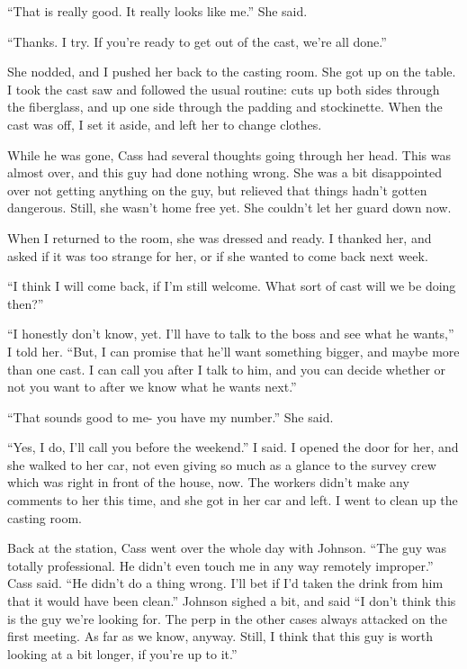 ``That is really good. It really looks like me.'' She said.

``Thanks. I try. If you're ready to get out of the cast, we're all done.''

She nodded, and I pushed her back to the casting room. She got up on the table. I took the
cast saw and followed the usual routine: cuts up both sides through the fiberglass, and up one
side through the padding and stockinette. When the cast was off, I set it aside, and left her to
change clothes.

While he was gone, Cass had several thoughts going through her head. This was almost over,
and this guy had done nothing wrong. She was a bit disappointed over not getting anything on the
guy, but relieved that things hadn't gotten dangerous. Still, she wasn't home free yet. She
couldn't let her guard down now.

When I returned to the room, she was dressed and ready. I thanked her, and asked if it was
too strange for her, or if she wanted to come back next week.

``I think I will come back, if I'm still welcome. What sort of cast will we be doing
then?''

``I honestly don't know, yet. I'll have to talk to the boss and see what he wants,'' I
told her. ``But, I can promise that he'll want something bigger, and maybe more than one cast. I
can call you after I talk to him, and you can decide whether or not you want to after we know
what he wants next.''

``That sounds good to me- you have my number.'' She said.

``Yes, I do, I'll call you before the weekend.'' I said. I opened the door for her, and
she walked to her car, not even giving so much as a glance to the survey crew which was right in
front of the house, now. The workers didn't make any comments to her this time, and she got in
her car and left. I went to clean up the casting room.

Back at the station, Cass went over the whole day with Johnson.  ``The guy was totally
professional. He didn't even touch me in any way remotely improper.'' Cass said. ``He didn't do
a thing wrong. I'll bet if I'd taken the drink from him that it would have been clean.'' Johnson
sighed a bit, and said ``I don't think this is the guy we're looking for. The perp in the other
cases always attacked on the first meeting. As far as we know, anyway. Still, I think that this
guy is worth looking at a bit longer, if you're up to it.''

